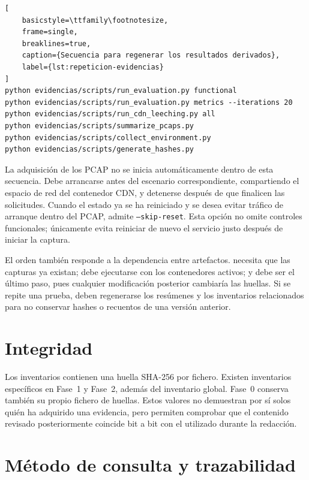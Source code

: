 \begin{lstlisting}[
    basicstyle=\ttfamily\footnotesize,
    frame=single,
    breaklines=true,
    caption={Secuencia para regenerar los resultados derivados},
    label={lst:repeticion-evidencias}
]
python evidencias/scripts/run_evaluation.py functional
python evidencias/scripts/run_evaluation.py metrics --iterations 20
python evidencias/scripts/run_cdn_leeching.py all
python evidencias/scripts/summarize_pcaps.py
python evidencias/scripts/collect_environment.py
python evidencias/scripts/generate_hashes.py
\end{lstlisting}

La adquisición de los PCAP no se inicia automáticamente dentro de esta secuencia. Debe arrancarse antes del escenario correspondiente, compartiendo el espacio de red del contenedor CDN, y detenerse después de que finalicen las solicitudes. Cuando el estado ya se ha reiniciado y se desea evitar tráfico de arranque dentro del PCAP,  admite \texttt{--skip-reset}. Esta opción no omite controles funcionales; únicamente evita reiniciar de nuevo el servicio justo después de iniciar la captura.

El orden también responde a la dependencia entre artefactos.  necesita que las capturas ya existan;  debe ejecutarse con los contenedores activos; y  debe ser el último paso, pues cualquier modificación posterior cambiaría las huellas. Si se repite una prueba, deben regenerarse los resúmenes y los inventarios relacionados para no conservar hashes o recuentos de una versión anterior.

\section{Integridad}

Los inventarios  contienen una huella SHA-256 por fichero. Existen inventarios específicos en Fase~1 y Fase~2, además del inventario global. Fase~0 conserva también su propio fichero de huellas. Estos valores no demuestran por sí solos quién ha adquirido una evidencia, pero permiten comprobar que el contenido revisado posteriormente coincide bit a bit con el utilizado durante la redacción.

\section{Método de consulta y trazabilidad}

